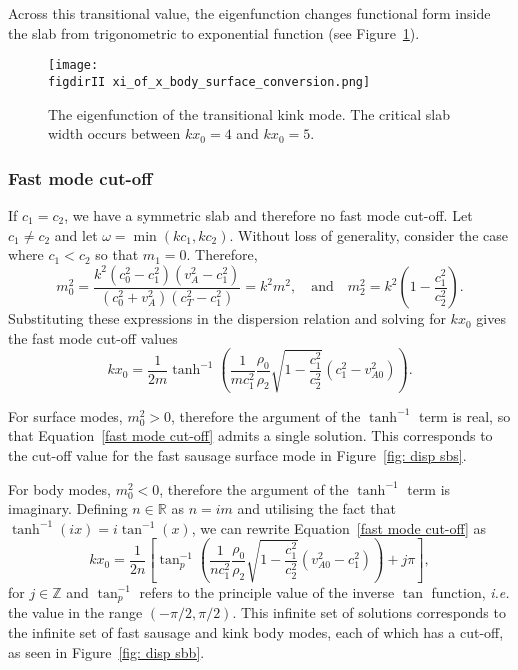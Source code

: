 Across this transitional value, the eigenfunction changes functional form inside the slab from trigonometric to exponential function (see Figure~\ref{fig: transitional kink eigenfunction}). 
\begin{figure}
	\centering
	\texttt{[image: \\figdirII xi\_of\_x\_body\_surface\_conversion.png]}
	\caption{The eigenfunction of the transitional kink mode. The critical slab width occurs between $kx_0 = 4$ and $kx_0 = 5$.}
	\label{fig: transitional kink eigenfunction}
\end{figure}


\subsubsection{Fast mode cut-off} \label{sec: fast mode cut-off}
If $c_1 = c_2$, we have a symmetric slab and therefore no fast mode cut-off. Let $c_1 \neq c_2$ and let $\omega = \min(kc_1, kc_2)$. Without loss of generality, consider the case where $c_1 < c_2$ so that $m_1 = 0$. Therefore,
\begin{equation}
m_0^2 = \frac{k^2 (c_0^2 - c_1^2)(v_A^2 - c_1^2)}{(c_0^2 + v_A^2)(c_T^2 - c_1^2)} = k^2m^2,
\quad \text{and} \quad
m_2^2 = k^2\left(1-\frac{c_1^2}{c_2^2}\right).
\end{equation}
Substituting these expressions in the dispersion relation and solving for $kx_0$ gives the fast mode cut-off values
\begin{equation}
kx_0 = \frac{1}{2m} \tanh^{-1}\left( \frac{1}{m c_1^2} \frac{\rho_0}{\rho_2} \sqrt{1 - \frac{c_1^2}{c_2^2}}(c_1^2 - v_{A0}^2) \right). \label{fast mode cut-off}
\end{equation}

For surface modes, $m_0^2 > 0$, therefore the argument of the $\tanh^{-1}$ term is real, so that Equation~\eqref{fast mode cut-off} admits a single solution. This corresponds to the cut-off value for the fast sausage surface mode in Figure~\ref{fig: disp sbs}.
 
For body modes, $m_0^2 < 0$, therefore the argument of the $\tanh^{-1}$ term is imaginary. Defining $n \in \mathbb{R}$ as $n = im$ and utilising the fact that $\tanh^{-1}(ix) = i\tan^{-1}(x)$, we can rewrite Equation~\eqref{fast mode cut-off} as
\begin{equation}
kx_0 = \frac{1}{2n} \left[\tan_p^{-1}\left( \frac{1}{n c_1^2} \frac{\rho_0}{\rho_2} \sqrt{1 - \frac{c_1^2}{c_2^2}}(v_{A0}^2 - c_1^2) \right) + j\pi \right], \label{fast mode cut-off 2}
\end{equation}
for $j \in \mathbb{Z}$ and $\tan_p^{-1}$ refers to the principle value of the inverse $\tan$ function, \textit{i.e.} the value in the range $(-\pi/2, \pi/2)$. This infinite set of solutions corresponds to the infinite set of fast sausage and kink body modes, each of which has a cut-off, as seen in Figure~\ref{fig: disp sbb}.

